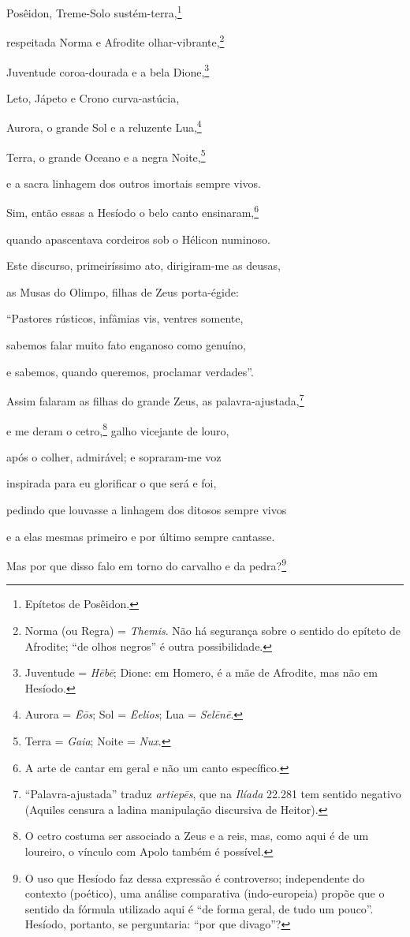 \begin{pages}
\begin{Rightside}
Posêidon, Treme-Solo sustém-terra,\footnote{Epítetos de Posêidon.} 

respeitada Norma e Afrodite olhar-vibrante,\footnote{Norma (ou Regra) = \emph{Themis}. Não há segurança sobre o sentido do epíteto de Afrodite; ``de olhos
negros'' é outra possibilidade.}

Juventude coroa-dourada e a bela Dione,\footnote{Juventude = \emph{Hēbē}; Dione: em Homero, é a mãe de Afrodite, mas não em Hesíodo.}

Leto, Jápeto e Crono curva-astúcia,

Aurora, o grande Sol e a reluzente Lua,\footnote{Aurora = \emph{Ēōs}; Sol = \emph{Ēelios}; Lua = \emph{Selēnē}.}

Terra, o grande Oceano e a negra Noite,\footnote{Terra = \emph{Gaia}; Noite = \emph{Nux}.} 

e a sacra linhagem dos outros imortais sempre vivos.

\quad{}Sim, então essas a Hesíodo o belo canto ensinaram,\footnote{A arte de cantar em geral e não um canto específico.}

quando apascentava cordeiros sob o Hélicon numinoso.

Este discurso, primeiríssimo ato, dirigiram-me as deusas,

as Musas do Olimpo, filhas de Zeus porta-égide: 

``Pastores rústicos, infâmias vis, ventres somente,

sabemos falar muito fato enganoso como genuíno,

e sabemos, quando queremos, proclamar verdades''.

Assim falaram as filhas do grande Zeus, as palavra-ajustada,\footnote{``Palavra-ajustada'' traduz \emph{artiepēs}, que na \emph{Ilíada}
22.281 tem sentido negativo (Aquiles censura a ladina manipulação
discursiva de Heitor).}

e me deram o cetro,\footnote{O cetro costuma ser associado a Zeus e a reis, mas, como aqui é de
um loureiro, o vínculo com Apolo também é possível.} galho vicejante de louro, 

após o colher, admirável; e sopraram-me voz

inspirada para eu glorificar o que será e foi,

pedindo que louvasse a linhagem dos ditosos sempre vivos

e a elas mesmas primeiro e por último sempre cantasse.

\quad{}Mas por que disso falo em torno do carvalho e da pedra?\footnote{O uso que Hesíodo faz dessa expressão é controverso; independente do
contexto (poético), uma análise comparativa (indo-europeia) propõe que o
sentido da fórmula utilizado aqui é ``de forma geral, de tudo um
pouco''. Hesíodo, portanto, se perguntaria: ``por que divago''?} 


\end{Rightside}
\end{pages}
